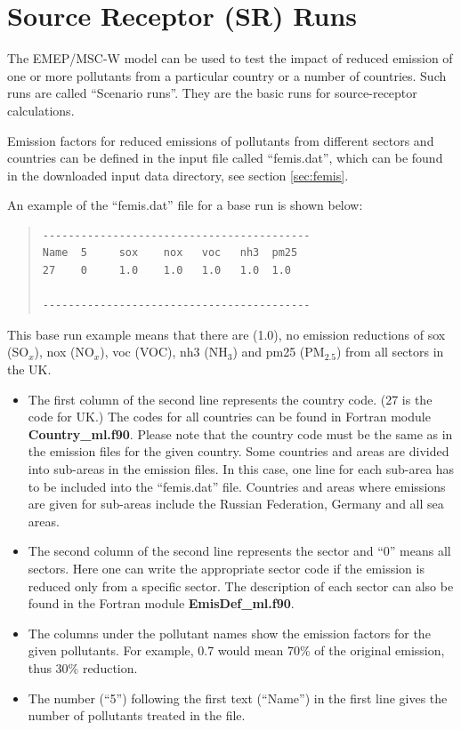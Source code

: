 \documentclass[a4paper,12pt]{report}
\begin{document}
\section {Source Receptor (SR) Runs}

The EMEP/MSC-W model can be used to test the impact of reduced emission of
one or more pollutants from a particular country or a number of
countries.  Such runs are called ``Scenario runs''. They are the basic
runs for source-receptor calculations.

Emission factors for reduced emissions of pollutants from different
sectors and countries can be defined in the input file called
``femis.dat'', which can be found in the downloaded input data
directory, see section \ref{sec:femis}.

An example of the ``femis.dat'' file for a base run is shown below:
\begin{quote}

\begin{verbatim}
------------------------------------------
Name  5     sox    nox   voc   nh3  pm25
27    0     1.0    1.0   1.0   1.0  1.0  

------------------------------------------
\end{verbatim}
\end{quote}
\noindent
This base run example means that there are (1.0), no emission reductions of 
sox (SO$_x$), nox (NO$_x$), voc (VOC), nh3 (NH$_3$) and pm25 (PM$_{2.5}$) from 
all sectors in the UK. 

\begin{itemize}

\item The first column of
the second line represents the country code. (27 is the code for UK.)
The codes for all countries can be found in  Fortran module {\bf
  Country\_ml.f90}. Please note that the country code must be the same
as in the emission files for the given country. Some
countries and areas are divided into sub-areas in the emission
files. In this case, one line for each sub-area has to be included
into the ``femis.dat'' file. Countries and areas where emissions are
given for sub-areas include the Russian Federation, Germany and all 
sea areas.    

\item The second
column of the second line 
represents the sector and ``0'' means all sectors. Here one can write
the appropriate sector code if the emission is reduced only from a specific
sector. The description of each sector can also be found in the Fortran
module {\bf EmisDef\_ml.f90}. 

\item The columns under the pollutant names show the emission factors
  for the given pollutants. For example, 0.7 would mean 70\% of the
  original emission, thus 30\% reduction.

\item The number (``5'') following
the first text (``Name'') in the first line gives the number of
pollutants treated in the file.   
              
\end{itemize}
\end{document}
